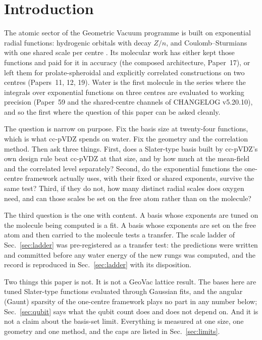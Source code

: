 \documentclass[aps,pra,twocolumn,superscriptaddress,longbibliography]{revtex4-2}
\begin{document}
\maketitle

\section{Introduction}
\label{sec:intro}

The atomic sector of the Geometric Vacuum programme is built on
exponential radial functions: hydrogenic orbitals with decay $Z/n$, and
Coulomb--Sturmians with one shared scale per centre
\cite{avery2006,avery2017}.  Its molecular work has either kept those
functions and paid for it in accuracy (the composed architecture,
Paper~17), or left them for prolate-spheroidal and explicitly correlated
constructions on two centres (Papers~11, 12, 19).  Water is the first
molecule in the series where the integrals over exponential functions
on three centres are evaluated to working precision (Paper~59 and the
shared-centre channels of CHANGELOG v5.20.10), and so the first where
the question of this paper can be asked cleanly.

The question is narrow on purpose.  Fix the basis size at twenty-four
functions, which is what cc-pVDZ \cite{dunning1989} spends on water.
Fix the geometry and the correlation method.  Then ask three things.
First, does a Slater-type basis built by cc-pVDZ's own design rule beat
cc-pVDZ at that size, and by how much at the mean-field and the
correlated level separately?  Second, do the exponential functions the
one-centre framework actually uses, with their fixed or shared
exponents, survive the same test?  Third, if they do not, how many
distinct radial scales does oxygen need, and can those scales be set on
the free atom rather than on the molecule?

The third question is the one with content.  A basis whose exponents
are tuned on the molecule being computed is a fit.  A basis whose
exponents are set on the free atom and then carried to the molecule
tests a transfer.  The scale ladder of Sec.~\ref{sec:ladder} was
pre-registered as a transfer test: the predictions were written and
committed before any water energy of the new rungs was computed, and
the record is reproduced in Sec.~\ref{sec:ladder} with its disposition.

Two things this paper is not.  It is not a GeoVac lattice result.  The
bases here are tuned Slater-type functions evaluated through Gaussian
fits, and the angular (Gaunt) sparsity of the one-centre framework
\cite{paper22} plays no part in any number below; Sec.~\ref{sec:qubit}
says what the qubit count does and does not depend on.  And it is not a
claim about the basis-set limit.  Everything is measured at one size,
one geometry and one method, and the caps are listed in
Sec.~\ref{sec:limits}.
\end{document}
